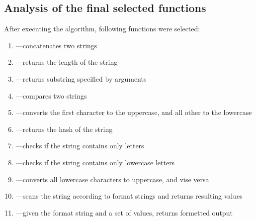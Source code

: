 \documentclass[11pt,nonacm,natbib=false]{acmart}
\begin{document}
\subsection{Analysis of the final selected functions}
After executing the algorithm, following functions were selected:
\begin{enumerate}
    \item {}---concatenates two strings
    \item {}---returns the length of the string
    \item {}---returns substring specified by arguments
    \item {}---compares two strings
    \item {}---converts the first character to the uppercase, and all other to the lowercase
    \item {}---returns the hash of the string
    \item {}---checks if the string contains only letters
    \item {}---checks if the string contains only lowercase letters
    \item {}---converts all lowercase characters to uppercase, and vise versa
    \item {}---scans the string according to format strings and returns resulting values
    \item {}---given the format string and a set of values, returns formetted output
\end{enumerate}
\end{document}
